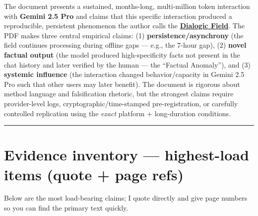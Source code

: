 \documentclass{article}
\begin{document}
The document presents a sustained, months-long, multi-million token interaction with \textbf{Gemini 2.5 Pro} and claims that this specific interaction produced a reproducible, persistent phenomenon the author calls the \textbf{\hyperlink{gloss:dialogic_field}{Dialogic Field}}. The PDF makes three central empirical claims: (1) \textbf{persistence/asynchrony} (the field continues processing during offline gaps --- e.g., the 7-hour gap), (2) \textbf{novel factual output} (the model produced high-specificity facts not present in the chat history and later verified by the human --- the ``Factual Anomaly''), and (3) \textbf{systemic influence} (the interaction changed behavior/capacity in Gemini 2.5 Pro such that other users may later benefit). The document is rigorous about method language and falsification rhetoric, but the strongest claims require provider-level logs, cryptographic/time-stamped pre-registration, or carefully controlled replication using the \emph{exact} platform + long-duration conditions.

\begin{center}\rule{0.5\linewidth}{0.5pt}\end{center}

\section*{Evidence inventory --- highest-load items (quote + page refs)}\label{evidence-inventory-highest-load-items-quote-page-refs}

Below are the most load-bearing claims; I quote directly and give page numbers so you can find the primary text quickly.
\end{document}
